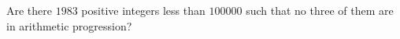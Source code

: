 Are there $1983$ positive integers less than $100000$ such that no three of them are in arithmetic progression?
